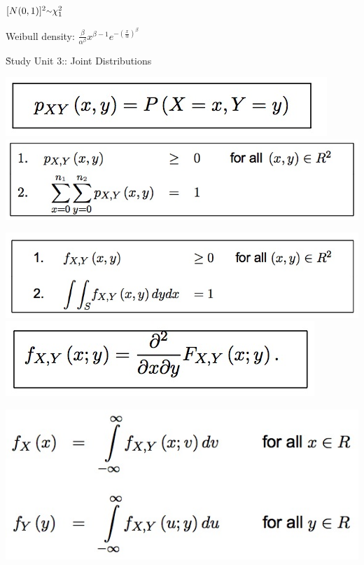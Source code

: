 \documentclass{/out/app/latex/examnotes}
\begin{document}
{\vspace{6pt}
$[N(0,1)]^2\mytilde \chi^2_1$

Weibull density: $\displaystyle\frac{\beta}{\alpha^\beta}x^{\beta-1}e^{-\left(\displaystyle\frac{x}{\alpha}\right)^\beta}$

\h{Study Unit 3:: Joint Distributions}


\includegraphics[scale=0.4]{./img/3jd1.jpg}
\includegraphics[scale=0.4]{./img/3jd2.jpg}


\includegraphics[scale=0.4]{./img/3con1.jpg}
\includegraphics[scale=0.4]{./img/3con2.jpg}

\includegraphics[scale=0.4]{./img/3con3.jpg}

}
\end{document}
